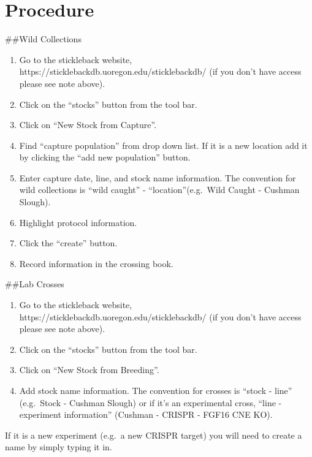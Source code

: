 \documentclass[
  letterpaper,
  DIV=11,
  numbers=noendperiod]{scrreprt}
\providecommand{\tightlist}{%
  \setlength{\itemsep}{0pt}\setlength{\parskip}{0pt}}\usepackage{longtable,booktabs,array}
\begin{document}
\hypertarget{procedure-35}{%
\section{Procedure}\label{procedure-35}}

\#\#Wild Collections

\begin{enumerate}
\def\labelenumi{\arabic{enumi}.}
\tightlist
\item
  Go to the stickleback website,
  https://sticklebackdb.uoregon.edu/sticklebackdb/ (if you don't have
  access please see note above).
\item
  Click on the ``stocks'' button from the tool bar.
\item
  Click on ``New Stock from Capture''.
\item
  Find ``capture population'' from drop down list. If it is a new
  location add it by clicking the ``add new population'' button.
\item
  Enter capture date, line, and stock name information. The convention
  for wild collections is ``wild caught'' - ``location''(e.g.~Wild
  Caught - Cushman Slough).
\item
  Highlight protocol information.
\item
  Click the ``create'' button.
\item
  Record information in the crossing book.
\end{enumerate}

\#\#Lab Crosses

\begin{enumerate}
\def\labelenumi{\arabic{enumi}.}
\tightlist
\item
  Go to the stickleback website,
  https://sticklebackdb.uoregon.edu/sticklebackdb/ (if you don't have
  access please see note above).
\item
  Click on the ``stocks'' button from the tool bar.
\item
  Click on ``New Stock from Breeding''.
\item
  Add stock name information. The convention for crosses is ``stock -
  line'' (e.g.~Stock - Cushman Slough) or if it's an experimental cross,
  ``line - experiment information'' (Cushman - CRISPR - FGF16 CNE KO).
\end{enumerate}

\begin{tcolorbox}[enhanced jigsaw, toprule=.15mm, breakable, coltitle=black, leftrule=.75mm, title=\textcolor{quarto-callout-warning-color}{\faExclamationTriangle}\hspace{0.5em}{NOTE}, bottomrule=.15mm, toptitle=1mm, bottomtitle=1mm, colframe=quarto-callout-warning-color-frame, opacityback=0, colback=white, opacitybacktitle=0.6, colbacktitle=quarto-callout-warning-color!10!white, rightrule=.15mm, titlerule=0mm, arc=.35mm, left=2mm]

If it is a new experiment (e.g.~a new CRISPR target) you will need to
create a name by simply typing it in.

\end{tcolorbox}
\end{document}
